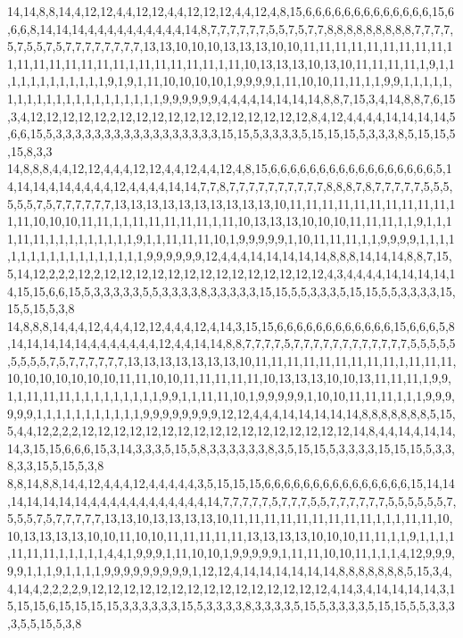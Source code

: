 14,14,8,8,14,4,12,12,4,4,12,12,4,4,12,12,12,4,4,12,4,8,15,6,6,6,6,6,6,6,6,6,6,6,6,6,15,6,6,6,8,14,14,14,4,4,4,4,4,4,4,4,4,4,14,8,7,7,7,7,7,7,5,5,7,5,7,7,8,8,8,8,8,8,8,8,8,7,7,7,7,5,7,5,5,7,5,7,7,7,7,7,7,7,7,13,13,10,10,10,13,13,13,10,10,11,11,11,11,11,11,11,11,11,11,11,11,11,11,11,11,11,1,11,11,11,11,11,1,11,10,13,13,13,10,13,10,11,11,11,11,1,9,1,1,1,1,1,1,1,1,1,1,1,1,9,1,9,1,11,10,10,10,10,1,9,9,9,9,1,11,10,10,11,11,1,1,9,9,1,1,1,1,1,1,1,1,1,1,1,1,1,1,1,1,1,1,1,1,1,9,9,9,9,9,9,4,4,4,4,14,14,14,14,8,8,7,15,3,4,14,8,8,7,6,15,3,4,12,12,12,12,12,2,12,12,12,12,12,12,12,12,12,12,12,12,8,4,12,4,4,4,4,14,14,14,14,5,6,6,15,5,3,3,3,3,3,3,3,3,3,3,3,3,3,3,3,3,3,15,15,5,3,3,3,3,5,15,15,15,5,3,3,3,8,5,15,15,5,15,8,3,3
14,8,8,8,4,4,12,12,4,4,4,12,12,4,4,12,4,4,12,4,8,15,6,6,6,6,6,6,6,6,6,6,6,6,6,6,6,6,6,5,14,14,14,4,14,4,4,4,4,12,4,4,4,4,14,14,7,7,8,7,7,7,7,7,7,7,7,7,7,8,8,8,7,8,7,7,7,7,7,5,5,5,5,5,5,7,5,7,7,7,7,7,7,13,13,13,13,13,13,13,13,13,13,10,11,11,11,11,11,11,11,11,11,11,11,11,10,10,10,11,11,1,1,11,11,11,11,11,1,11,10,13,13,13,10,10,10,11,11,11,1,1,9,1,1,11,11,11,1,1,1,1,1,1,1,1,1,9,1,1,11,11,11,10,1,9,9,9,9,9,1,10,11,11,11,1,1,9,9,9,9,1,1,1,1,1,1,1,1,1,1,1,1,1,1,1,1,1,1,9,9,9,9,9,9,12,4,4,4,14,14,14,14,14,8,8,8,14,14,14,8,8,7,15,5,14,12,2,2,2,12,2,12,12,12,12,12,12,12,12,12,12,12,12,12,12,4,3,4,4,4,4,14,14,14,14,14,15,15,6,6,15,5,3,3,3,3,3,5,5,3,3,3,3,8,3,3,3,3,3,15,15,5,5,3,3,3,5,15,15,5,5,3,3,3,3,15,15,5,15,5,3,8
14,8,8,8,14,4,4,12,4,4,4,12,12,4,4,4,12,4,14,3,15,15,6,6,6,6,6,6,6,6,6,6,6,6,15,6,6,6,5,8,14,14,14,14,14,4,4,4,4,4,4,4,12,4,4,14,14,8,8,7,7,7,7,5,7,7,7,7,7,7,7,7,7,7,7,7,5,5,5,5,5,5,5,5,5,7,5,7,7,7,7,7,7,13,13,13,13,13,13,13,10,11,11,11,11,11,11,11,11,11,1,11,11,11,10,10,10,10,10,10,10,11,11,10,10,11,11,11,11,11,10,13,13,13,10,10,13,11,11,11,1,9,9,1,1,11,11,11,1,1,1,1,1,1,1,1,1,9,9,1,1,11,11,10,1,9,9,9,9,9,1,10,10,11,11,11,1,1,1,9,9,9,9,9,9,1,1,1,1,1,1,1,1,1,1,1,9,9,9,9,9,9,9,9,12,12,4,4,4,14,14,14,14,14,8,8,8,8,8,8,8,5,15,5,4,4,12,2,2,2,12,12,12,12,12,12,12,12,12,12,12,12,12,12,12,12,12,14,8,4,4,14,4,14,14,14,3,15,15,6,6,6,15,3,14,3,3,3,5,15,5,8,3,3,3,3,3,3,8,3,5,15,15,5,3,3,3,3,15,15,15,5,3,3,8,3,3,15,5,15,5,3,8
8,8,14,8,8,14,4,12,4,4,4,12,4,4,4,4,4,3,5,15,15,15,6,6,6,6,6,6,6,6,6,6,6,6,6,6,6,15,14,14,14,14,14,14,14,4,4,4,4,4,4,4,4,4,4,4,4,14,7,7,7,7,7,5,7,7,7,5,5,7,7,7,7,7,7,5,5,5,5,5,5,7,5,5,5,7,5,7,7,7,7,7,13,13,10,13,13,13,13,10,11,11,11,11,11,11,11,11,11,1,1,1,11,11,10,10,13,13,13,13,10,10,11,10,10,11,11,11,11,11,13,13,13,13,10,10,10,11,11,1,1,9,1,1,1,1,11,11,11,1,1,1,1,1,4,4,1,9,9,9,1,11,10,10,1,9,9,9,9,9,1,11,11,10,10,11,1,1,1,4,12,9,9,9,9,9,1,1,1,9,1,1,1,1,9,9,9,9,9,9,9,9,9,1,12,12,4,14,14,14,14,14,14,8,8,8,8,8,8,8,5,15,3,4,4,14,4,2,2,2,2,9,12,12,12,12,12,12,12,12,12,12,12,12,12,12,12,4,14,3,4,14,14,14,14,3,15,15,15,6,15,15,15,15,3,3,3,3,3,3,15,5,3,3,3,3,8,3,3,3,3,5,15,5,3,3,3,3,5,15,15,5,5,3,3,3,3,5,5,15,5,3,8
